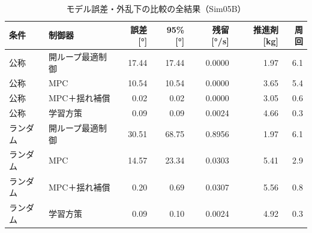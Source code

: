 \begin{longtable}{llrrrrr}
\caption{モデル誤差・外乱下の比較の全結果（Sim05B）}\\
\toprule
条件 & 制御器 & 誤差 [°] & 95\% [°] & 残留 [°/s] & 推進剤 [kg] & 周回 \\ \midrule \endhead
公称 & 開ループ最適制御 & 17.44 & 17.44 & 0.0000 & 1.97 & 6.1 \\
公称 & MPC & 10.54 & 10.54 & 0.0000 & 3.65 & 5.4 \\
公称 & MPC＋揺れ補償 & 0.02 & 0.02 & 0.0000 & 3.05 & 0.6 \\
公称 & 学習方策 & 0.09 & 0.09 & 0.0024 & 4.66 & 0.3 \\
ランダム & 開ループ最適制御 & 30.51 & 68.75 & 0.8956 & 1.97 & 6.1 \\
ランダム & MPC & 14.57 & 23.34 & 0.0303 & 5.41 & 2.9 \\
ランダム & MPC＋揺れ補償 & 0.20 & 0.69 & 0.0307 & 5.56 & 0.8 \\
ランダム & 学習方策 & 0.09 & 0.10 & 0.0024 & 4.92 & 0.3 \\
\bottomrule
\end{longtable}
